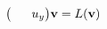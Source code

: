 \documentclass[preview]{standalone}
\begin{document}
\begin{align*}
\big( \hphantom{u_x} \;\; u_y \big) \mathbf{v} = L ( \mathbf{v} )
\end{align*}
\end{document}

